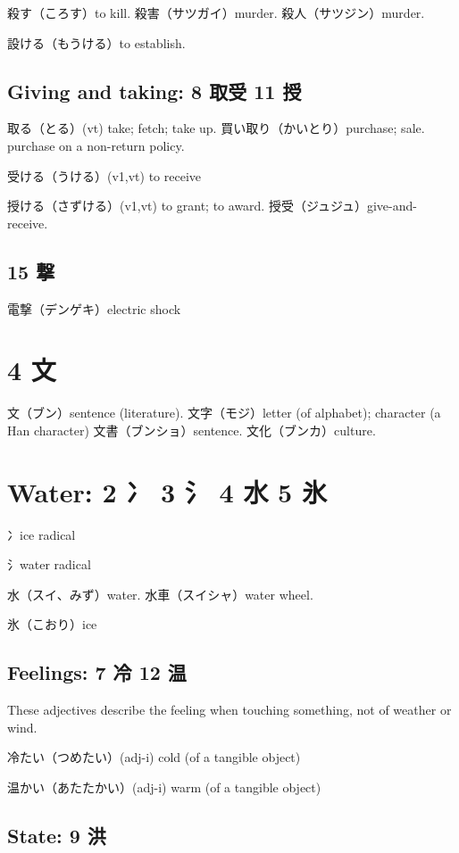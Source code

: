 殺す（ころす）to kill.
殺害（サツガイ）murder.
殺人（サツジン）murder.

設ける（もうける）to establish.

\subsection{Giving and taking: 8 取受 11 授}

取る（とる）(vt) take; fetch; take up.
買い取り（かいとり）purchase; sale. purchase on a non-return policy.

受ける（うける）(v1,vt) to receive

授ける（さずける）(v1,vt) to grant; to award.
授受（ジュジュ）give-and-receive.

\subsection{15 撃}

電撃（デンゲキ）electric shock

\section{4 文}

文（ブン）sentence (literature).
文字（モジ）letter (of alphabet); character (a Han character)
文書（ブンショ）sentence.
文化（ブンカ）culture.

\section{Water: 2 冫 3 氵 4 水 5 氷}

冫ice radical

氵water radical

水（スイ、みず）water.
水車（スイシャ）water wheel.

氷（こおり）ice

\subsection{Feelings: 7 冷 12 温}

These adjectives describe the feeling when
touching something, not of weather or wind.

冷たい（つめたい）(adj-i) cold (of a tangible object)

温かい（あたたかい）(adj-i) warm (of a tangible object)

\subsection{State: 9 洪}

